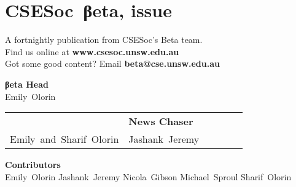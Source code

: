 \documentclass[twoside]{article}
\date{25 April 2016}
\makeatletter
\gdef\the@issue{118}
\makeatother
\begin{document}

\newpage
\maketitle\thispagestyle{mag}
\vspace*{-2em}\section*{CSE{}Soc~βeta, issue \makeatletter\the@issue}
\begin{multicols}{2}\begingroup\raggedcolumns
\begin{center}
A fortnightly publication from CSESoc's Beta team.\\
Find us online at \textbf{www.csesoc.unsw.edu.au}\\
Got some good content? Email \textbf{beta@cse.unsw.edu.au}\\
\par{\bf\sffamily βeta Head}\\ Emily~Olorin
\par\begin{tabular}{>{\raggedleft}p{0.5\linewidth}>{\raggedright}p{0.5\linewidth}}
{\bf\sffamily Puzzle Wrangler} & {\bf\sffamily News Chaser}\tabularnewline
Emily~and~Sharif~Olorin & Jashank~Jeremy\tabularnewline
\end{tabular}
\par{\bf\sffamily Contributors}\\
  Emily~Olorin\hsp{}
  Jashank~Jeremy\hsp{}
  Nicola~Gibson\hsp{}
  Michael~Sproul\hsp{}
  Sharif~Olorin\hsp{}
\end{center}
\columnbreak\malcontents\vfill\endgroup
\end{multicols}\LRmulticolcolumns
\vspace*{-4em}\begin{multicols}{2}


\end{multicols}
\end{document}

